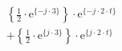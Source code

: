 \correct
\[
\begin{split}
&  \left \{ \frac{1}{2} \cdot \textrm{e}^{\{-j \cdot 3 \}} \right \} \cdot \textrm{e}^{\{- j \cdot 2 \cdot t \}}\\
& +\left \{ \frac{1}{2} \cdot \textrm{e}^{\{ j \cdot 3 \}} \right \} \cdot \textrm{e}^{\{  j \cdot 2 \cdot t \}}
\end{split}
\]
